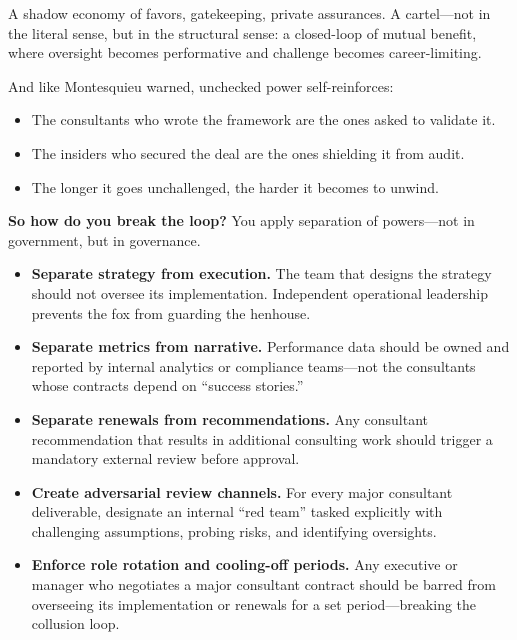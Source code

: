 A shadow economy of favors, gatekeeping, private assurances.  
A cartel—not in the literal sense, but in the structural sense: a closed-loop of mutual benefit, where oversight becomes performative and challenge becomes career-limiting.  

And like Montesquieu warned, unchecked power self-reinforces:  

\begin{itemize}
  \item The consultants who wrote the framework are the ones asked to validate it.  
  \item The insiders who secured the deal are the ones shielding it from audit.  
  \item The longer it goes unchallenged, the harder it becomes to unwind.
\end{itemize}

\medskip

\textbf{So how do you break the loop?}  
You apply separation of powers—not in government, but in governance.

\begin{itemize}
  \item \textbf{Separate strategy from execution.} The team that designs the strategy should not oversee its implementation. Independent operational leadership prevents the fox from guarding the henhouse.

  \item \textbf{Separate metrics from narrative.} Performance data should be owned and reported by internal analytics or compliance teams—not the consultants whose contracts depend on “success stories.”

  \item \textbf{Separate renewals from recommendations.} Any consultant recommendation that results in additional consulting work should trigger a mandatory external review before approval.

  \item \textbf{Create adversarial review channels.} For every major consultant deliverable, designate an internal “red team” tasked explicitly with challenging assumptions, probing risks, and identifying oversights.

  \item \textbf{Enforce role rotation and cooling-off periods.} Any executive or manager who negotiates a major consultant contract should be barred from overseeing its implementation or renewals for a set period—breaking the collusion loop.
\end{itemize}

